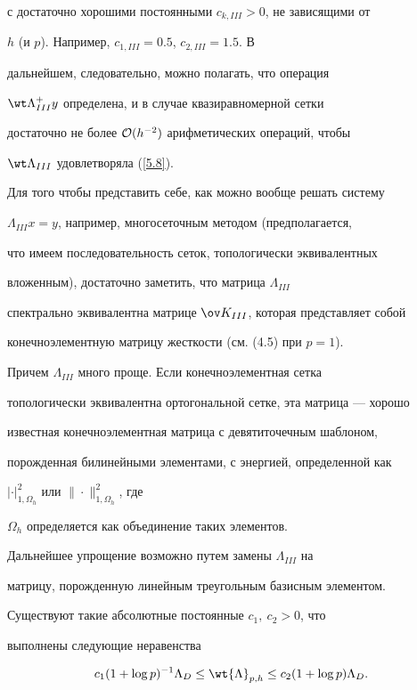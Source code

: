 с достаточно хорошими постоянными $c_{k,III}>0$, не зависящими от 


$h$ (и $p $). Например, $c_{1,III}=0.5$, $c_{2,III}=1.5$. В 


дальнейшем, следовательно, можно полагать, что операция 


$\wt \Lambda^+_{III}y$ определена, и в случае квазиравномерной сетки 


достаточно не более ${\cal O}(h^{-2})$ арифметических операций, чтобы 


$\wt \Lambda_{III}$ удовлетворяла (\ref{5.8}).





\begin{notes}


Для того чтобы представить себе, как можно вообще решать систему 


$\Lambda_{III}x=y$, например, многосеточным методом (предполагается, 


что имеем последовательность сеток, топологически эквивалентных 


вложенным), достаточно заметить, что матрица $\Lambda_{III}$ 


спектрально эквивалентна матрице $\ov K_{III}$, которая представляет собой 


конечноэлементную матрицу жесткости (см. (4.5) при $p=1$). 


Причем $\Lambda_{III}$ много проще. Если конечноэлементная сетка 


топологически эквивалентна ортогональной сетке, эта матрица --- хорошо 


известная конечноэлементная матрица с девятиточечным шаблоном, 


порожденная билинейными элементами, с энергией, определенной как 


$|\cdot|_{1,\Omega_h }^2$ или $\|\cdot\|_{1,\Omega_h}^2 $, где 


$\Omega_h$ определяется как объединение таких элементов. 


Дальнейшее упрощение возможно путем замены $ \Lambda_{III}$ на 


матрицу, порожденную линейным треугольным базисным элементом. 


\end{notes}





\begin{lems}\label{lem5.2}


Существуют такие абсолютные постоянные $c_1,\ c_2 >0$, что 


выполнены следующие неравенства 


\begin{equation}\label{5.15}


c_1(1+\log p)^{-1} \Lambda_D \leq \wt{\Lambda}_{p,h} \leq


c_2(1+\log p)\Lambda_D.


\end{equation}


\end{lems}





